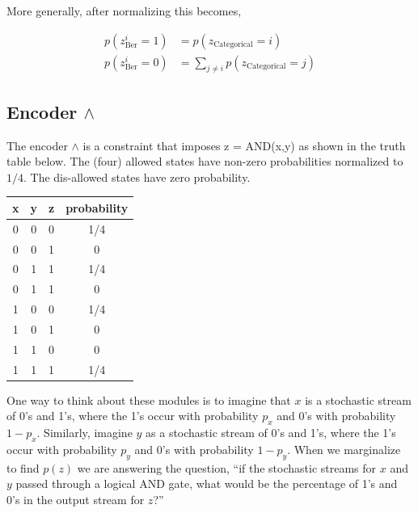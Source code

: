 \documentclass{article}
\begin{document}
More generally, after normalizing this becomes,

\begin{align}
    p(z^i_{\text{Ber}}=1) &= p(z_{\text{Categorical}}=i) \nonumber \\
    p(z^i_{\text{Ber}}=0) &= \sum_{j\neq i} p(z_{\text{Categorical}} =j)
\end{align}


\subsection{Encoder $\land$}


The encoder $\land$ is a constraint that imposes z = AND(x,y) as shown in the truth table below.  The (four) allowed states have non-zero probabilities normalized to $1/4$. The dis-allowed states have zero probability.

\begin{table}[H]
    \setlength{\extrarowheight}{5pt}
    \centering
    \begin{tabular}{c|c|c|c}
        \hline\hline
        x & y & z & probability \\[1ex]
        \hline
        0    & 0   & 0          & 1/4 \\
        0    & 0   & 1          & 0 \\
        0    & 1   & 1          & 1/4 \\
        0    & 1   & 1          & 0 \\
        1    & 0   & 0          & 1/4 \\
        1    & 0   & 1          & 0 \\
        1    & 1   & 0          & 0 \\
        1    & 1   & 1          & 1/4 \\[1ex]
        \hline
    \end{tabular}
    \label{tab:open-universe-encoder-truth-table}
\end{table}

One way to think about these modules is to imagine that $x$ is a stochastic stream of 0's and 1's, where the 1's occur with probability $p_x$ and 0's with probability $1-p_x$.  Similarly, imagine $y$ as a stochastic stream of 0's and 1's, where the 1's occur with probability $p_y$ and 0's with probability $1-p_y$.  When we marginalize to find $p(z)$ we are answering the question, ``if the stochastic streams for $x$ and $y$ passed through a logical AND gate, what would be the percentage of 1's and 0's in the output stream for $z$?''
\end{document}
